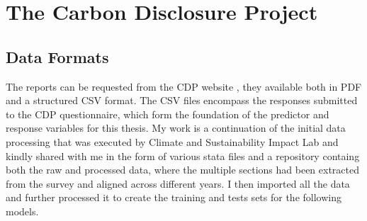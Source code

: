 \chapter{The Carbon Disclosure Project}

\section{Data Formats}

\noindent The reports can be requested from the CDP website \cite{CDPMain2024}, they available both in PDF and a structured CSV format. The CSV files encompass the responses submitted to the CDP questionnaire, which form the foundation of the predictor and response variables for this thesis. My work is a continuation of the initial data processing that was executed by Climate and Sustainability Impact Lab \cite{HarvardD3Lab2024} and kindly shared with me in the form of various stata files and a repository containg both the raw and processed data, where the multiple sections had been extracted from the survey and aligned across different years. I then imported all the data and further processed it to create the training and tests sets for the following models. 

